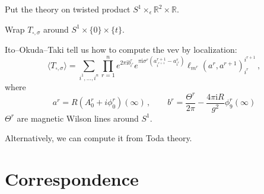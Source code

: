 \documentclass[t]{beamer}
\newcommand{\vev}[1]{\langle #1 \rangle}
\newcommand{\SU}{\mathrm{SU}}
\newcommand{\U}{\mathrm{U}}
\newcommand{\R}{\mathbb{R}}
\let\eps\epsilon
\newcommand{\iu}{\mathrm{i}}
\begin{document}
\begin{frame}

\end{frame}




\begin{frame}
  Put the theory on twisted product $S^1 \times_\eps \R^2 \times \R$.

  Wrap $T_{\square,\sigma}$ around $S^1 \times \{0\} \times \{t\}$.

  Ito--Okuda--Taki tell us how to compute the vev by localization:
  \begin{equation*}
    \vev{T_{\square, \sigma}}
    =
    \sum_{i^1, \dotsc, i^n}
    \prod_{r=1}^n
    e^{2\pi\iu b^r_{i^r}}
    e^{\pi\iu\sigma^r (a^{r+1}_{i^{r+1}} - a^r_{i^r})}
    \ell_{m^r}(a^r, a^{r+1})_{i^r}^{i^{r+1}}
    \,,
  \end{equation*}
  where
  \begin{equation*}
    a^r = R(A^r_0 + i\phi^r_0)(\infty) \,,
    \qquad
    b^r = \frac{\Theta^r}{2\pi} - \frac{4\pi\iu R}{g^2} \phi^r_9(\infty)
  \end{equation*}
  $\Theta^r$ are magnetic Wilson lines around $S^1$.

  Alternatively, we can compute it from Toda theory.
\end{frame}



\section*{Correspondence}
\end{document}
